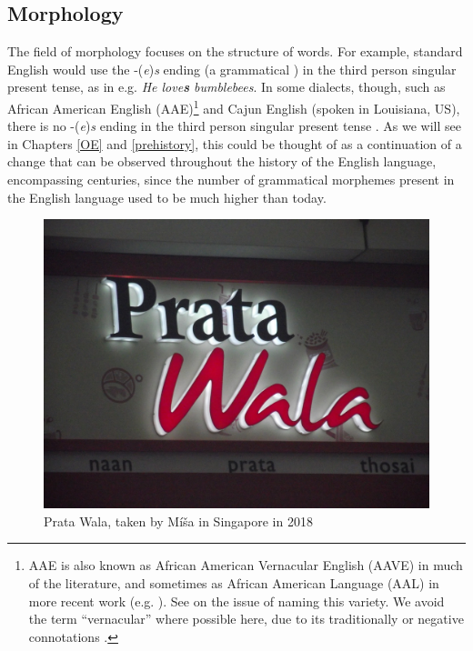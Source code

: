 \subsection{Morphology}\label{morphology}
The field of morphology focuses on the structure of words. For example, standard English would use the -(\emph{e})\emph{s} ending (a grammatical ) in the third person singular present tense, as in e.g. \textit{He love\textbf{s} bumblebees}. In some dialects, though, such as African American English (AAE)\footnote{AAE is also known as African American Vernacular English (AAVE) in much of the literature, and sometimes as African American Language (AAL) in more recent work (e.g. \citealp{Lanehart2015}). See \citet[5--8]{Green2002} on the issue of naming this variety. We avoid the term ``vernacular'' where possible here, due to its traditionally  or negative connotations \citep{Rajendran2019}.} and Cajun English (spoken in Louisiana, US), there is no -(\emph{e})\emph{s} ending in the third person singular present tense \citep{DuboisHorvath2003}. As we will see in Chapters \ref{OE} and \ref{prehistory}, this could be thought of as a continuation of a change that can be observed throughout the history of the English language, encompassing centuries, since the number of grammatical morphemes present in the English language used to be much higher than today.

\begin{figure}
    \centering
    \includegraphics[scale=0.115]{chapters/img/PrataWala.png}
    \caption{Prata Wala, taken by Míša in Singapore in 2018}
    \label{fig:pratawala}
\end{figure}

